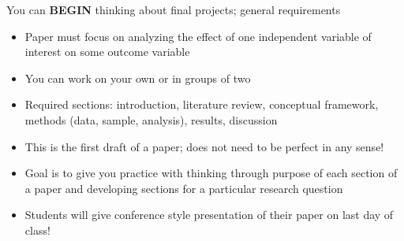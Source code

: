 \documentclass[
  8pt,
  ignorenonframetext,
  dvipsnames]{beamer}
\providecommand{\tightlist}{%
  \setlength{\itemsep}{0pt}\setlength{\parskip}{0pt}}
\renewcommand{\textbf}[1]{{\color{darkgray}\bfseries\fontfamily{Montserrat-TOsF}#1}}
\let\olditem\item
\renewcommand{\item}{%
  \olditem\vspace{4pt}
}
\begin{document}
\begin{frame}{You can \textbf{BEGIN} thinking about final projects;
general requirements}
\protect\hypertarget{you-can-begin-thinking-about-final-projects-general-requirements}{}

\begin{itemize}
\tightlist
\item
  Paper must focus on analyzing the effect of one independent variable
  of interest on some outcome variable
\item
  You can work on your own or in groups of two
\item
  Required sections: introduction, literature review, conceptual
  framework, methods (data, sample, analysis), results, discussion
\item
  This is the first draft of a paper; does not need to be perfect in any
  sense!
\item
  Goal is to give you practice with thinking through purpose of each
  section of a paper and developing sections for a particular research
  question
\item
  Students will give conference style presentation of their paper on
  last day of class!
\end{itemize}

\end{frame}
\end{document}
